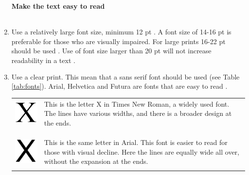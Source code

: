 \begin{enumerate}[{g}.1]
\textbf{Make the text easy to read} \\ \\

\item Use a relatively large font size, minimum 12 pt \cite{blindeforbundetTekst}. A font size of 14-16 pt is preferable for those who are visually impaired. For large prints 16-22 pt should be used \cite{actionforblindpeopleTekst}. Use of font size larger than 20 pt will not increase readability in a text \cite{blindeforbundetTekst}.     
\item Use a clear print. This mean that a sans serif font should be used (see Table \ref{tab:fonts}). Arial, Helvetica and Futura are fonts that are easy to read \cite{actionforblindpeopleTekst}.

\begin{table}
\centering
\begin{tabular}{ l p{8cm} }

\multirow{1}{*}{\includegraphics[scale=0.6]{font1.jpg}} & This is the letter X in Times New Roman, a widely used font. The lines have various widths, and there is a broader design at the ends. \\ \\ \\ \\
\multirow{1}{*}{\includegraphics[scale=0.6]{font2.jpg}} & This is the same letter in Arial. This font is easier to read for those with visual decline. Here the lines are equally wide all over, without the expansion at the ends. \\ \\


\end{tabular}
\end{table}
\end{enumerate}
